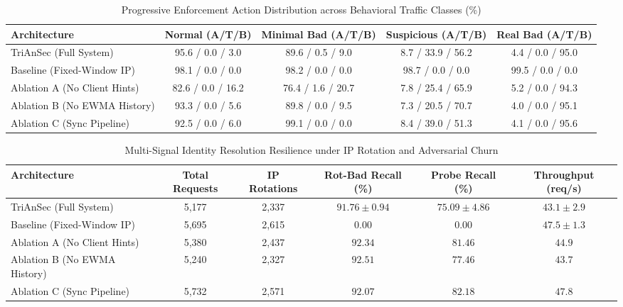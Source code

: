 \begin{table}[htbp]
\centering
\caption{Progressive Enforcement Action Distribution across Behavioral Traffic Classes (\%)}
\label{tab:progressive_enforcement}
\begin{tabular}{lcccc}
\hline
\textbf{Architecture} & \textbf{Normal (A/T/B)} & \textbf{Minimal Bad (A/T/B)} & \textbf{Suspicious (A/T/B)} & \textbf{Real Bad (A/T/B)} \\ \hline
TriAnSec (Full System) & 95.6 / 0.0 / 3.0 & 89.6 / 0.5 / 9.0 & 8.7 / 33.9 / 56.2 & 4.4 / 0.0 / 95.0 \\
Baseline (Fixed-Window IP) & 98.1 / 0.0 / 0.0 & 98.2 / 0.0 / 0.0 & 98.7 / 0.0 / 0.0 & 99.5 / 0.0 / 0.0 \\
Ablation A (No Client Hints) & 82.6 / 0.0 / 16.2 & 76.4 / 1.6 / 20.7 & 7.8 / 25.4 / 65.9 & 5.2 / 0.0 / 94.3 \\
Ablation B (No EWMA History) & 93.3 / 0.0 / 5.6 & 89.8 / 0.0 / 9.5 & 7.3 / 20.5 / 70.7 & 4.0 / 0.0 / 95.1 \\
Ablation C (Sync Pipeline) & 92.5 / 0.0 / 6.0 & 99.1 / 0.0 / 0.0 & 8.4 / 39.0 / 51.3 & 4.1 / 0.0 / 95.6 \\
\hline
\end{tabular}
\end{table}

\begin{table}[htbp]
\centering
\caption{Multi-Signal Identity Resolution Resilience under IP Rotation and Adversarial Churn}
\label{tab:identity_resilience}
\begin{tabular}{lccccc}
\hline
\textbf{Architecture} & \textbf{Total Requests} & \textbf{IP Rotations} & \textbf{Rot-Bad Recall (\%)} & \textbf{Probe Recall (\%)} & \textbf{Throughput (req/s)} \\ \hline
TriAnSec (Full System) & 5,177 & 2,337 & $91.76 \pm 0.94$ & $75.09 \pm 4.86$ & $43.1 \pm 2.9$ \\
Baseline (Fixed-Window IP) & 5,695 & 2,615 & $0.00$ & $0.00$ & $47.5 \pm 1.3$ \\
Ablation A (No Client Hints) & 5,380 & 2,437 & $92.34$ & $81.46$ & $44.9$ \\
Ablation B (No EWMA History) & 5,240 & 2,327 & $92.51$ & $77.46$ & $43.7$ \\
Ablation C (Sync Pipeline) & 5,732 & 2,571 & $92.07$ & $82.18$ & $47.8$ \\
\hline
\end{tabular}
\end{table}

